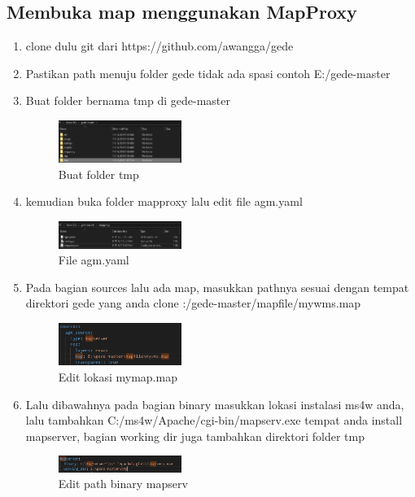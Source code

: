 \subsection{Membuka map menggunakan MapProxy}
\begin{enumerate}
  \item clone dulu git dari https://github.com/awangga/gede
  \item Pastikan path menuju folder gede tidak ada spasi contoh E:/gede-master
  \item Buat folder bernama tmp di gede-master
  \hfill\break
  \begin{figure}[H]
  \includegraphics[width=4cm]{figures/tugas4/1174079/8_Pembuatan_Folder_TMP.png}
  \centering
  \caption{Buat folder tmp}
  \end{figure}

  \item kemudian buka folder mapproxy lalu edit file agm.yaml
  \hfill\break
  \begin{figure}[H]
  \includegraphics[width=4cm]{figures/tugas4/1174079/9_fileAGM.png}
  \centering
  \caption{File agm.yaml}
  \end{figure}

  \item Pada bagian sources lalu ada map, masukkan pathnya sesuai dengan tempat direktori gede yang anda clone :/gede-master/mapfile/mywms.map
  \hfill\break
  \begin{figure}[H]
  \includegraphics[width=4cm]{figures/tugas4/1174079/10_Edit_AGM.png}
  \centering
  \caption{Edit lokasi mymap.map}
  \end{figure}


  \item Lalu dibawahnya pada bagian binary masukkan lokasi instalasi ms4w anda, lalu tambahkan C:/ms4w/Apache/cgi-bin/mapserv.exe tempat anda install mapserver, bagian working dir juga tambahkan direktori folder tmp
  \hfill\break
  \begin{figure}[H]
  \includegraphics[width=4cm]{figures/tugas4/1174079/11_Edit_AGM.png}
  \centering
  \caption{Edit path binary mapserv}
  \end{figure}


\end{enumerate}
